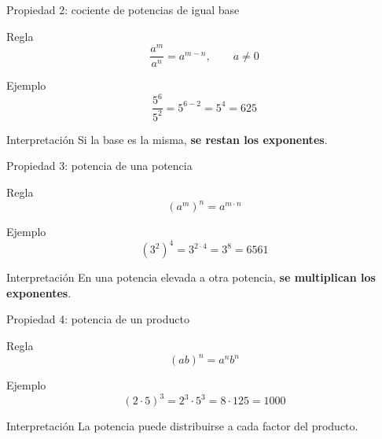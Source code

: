 \documentclass[aspectratio=169,10pt,handout]{beamer}
\newcommand{\destacar}[1]{\textcolor{USTBlueDark}{\textbf{#1}}}
\begin{document}
	\begin{frame}{Propiedad 2: cociente de potencias de igual base}
		\begin{block}{Regla}
			\[
			\frac{a^m}{a^n}=a^{m-n}, \qquad a\neq 0
			\]
		\end{block}
		
		\begin{exampleblock}{Ejemplo}
			\[
			\frac{5^6}{5^2}=5^{6-2}=5^4=625
			\]
		\end{exampleblock}
		
		\begin{alertblock}{Interpretación}
			Si la base es la misma, \destacar{se restan los exponentes}.
		\end{alertblock}
	\end{frame}
	
	\begin{frame}{Propiedad 3: potencia de una potencia}
		\begin{block}{Regla}
			\[
			(a^m)^n = a^{m\cdot n}
			\]
		\end{block}
		
		\begin{exampleblock}{Ejemplo}
			\[
			(3^2)^4 = 3^{2\cdot4}=3^8=6561
			\]
		\end{exampleblock}
		
		\begin{alertblock}{Interpretación}
			En una potencia elevada a otra potencia, \destacar{se multiplican los exponentes}.
		\end{alertblock}
	\end{frame}
	
	\begin{frame}{Propiedad 4: potencia de un producto}
		\begin{block}{Regla}
			\[
			(ab)^n = a^n b^n
			\]
		\end{block}
		
		\begin{exampleblock}{Ejemplo}
			\[
			(2\cdot5)^3 = 2^3\cdot5^3 = 8\cdot125 = 1000
			\]
		\end{exampleblock}
		
		\begin{alertblock}{Interpretación}
			La potencia puede distribuirse a cada factor del producto.
		\end{alertblock}
	\end{frame}
	
\end{document}
